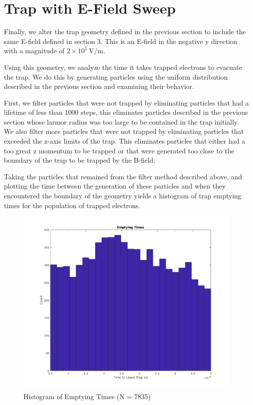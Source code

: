 \documentclass[12pt,letterpaper]{article}
\begin{document}
\section{Trap with E-Field Sweep}
Finally, we alter the trap geometry defined in the previous section to include the same E-field defined in section 3. This is an E-field in the negative y direction with a magnitude of $2\times10^5~$V/m. 

Using this geometry, we analyze the time it takes trapped electrons to evacuate the trap. We do this by generating particles using the uniform distribution described in the previous section and examining their behavior.

First, we filter particles that were not trapped by eliminating particles that had a lifetime of less than 1000 steps, this eliminates particles described in the previous section whose larmor radius was too large to be contained in the trap initially. We also filter more particles that were not trapped by eliminating particles that exceeded the z-axis limits of the trap. This eliminates particles that either had a too great z momentum to be trapped or that were generated too close to the boundary of the trap to be trapped by the B-field.

Taking the particles that remained from the filter method described above, and plotting the time between the generation of these particles and when they encountered the boundary of the geometry yields a histogram of trap emptying times for the population of trapped electrons. 

    \begin{figure}[H]
    \centering
    \includegraphics[width=0.7\linewidth]{img/emptying.png}
    \caption{Histogram of Emptying Times (N = 7835)}
    \end{figure}
\end{document}
